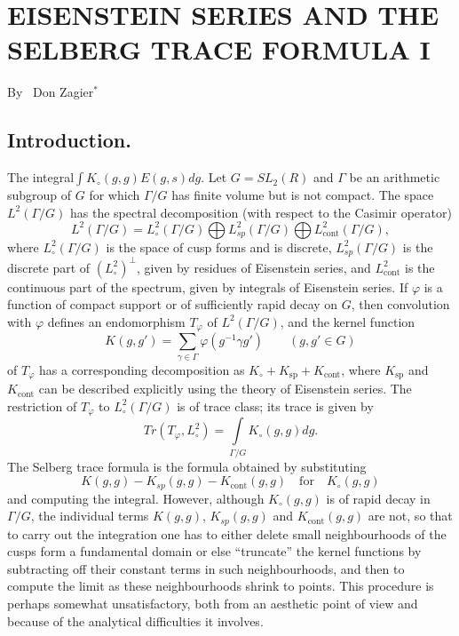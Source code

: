 \chapter{EISENSTEIN SERIES AND THE SELBERG TRACE FORMULA I}

\begin{center}
{\large By~ Don Zagier$^\ast$}
\end{center}

\bigskip

\setcounter{pageoriginal}{302}

\setcounter{section}{-1}
\section{Introduction.}\label{art11-sec0}
The integral\pageoriginale $\int K_\circ (g,g) E (g,s) dg$. Let $G = S L_2 (R)$ and $\Gamma$ be an arithmetic subgroup of $G$ for which $\Gamma / G$ has finite volume but is not compact. The space $L^2 (\Gamma / G)$ has the spectral decomposition (with respect to the Casimir operator)
$$
L^2 (\Gamma / G) = L^2_\circ (\Gamma / G) \bigoplus L^2_{sp} (\Gamma / G) \bigoplus L^2_{\text{cont}} (\Gamma / G),
$$
where $L^2_\circ (\Gamma / G)$ is the space of cusp forms and is discrete, $L^2_{sp} (\Gamma / G)$ is the discrete part of $(L^2_\circ)^\perp$, given by residues of Eisenstein series, and $L^2_{\text{cont}}$ is the continuous part of the spectrum, given by integrals of Eisenstein series. If $\varphi$ is a function of compact support or of sufficiently rapid decay on $G$, then convolution with $\varphi$ defines an endomorphism $T_\varphi$ of $L^2 (\Gamma / G)$, and the kernel function 
\begin{equation*}
K(g, g') = \sum\limits_{\gamma \in \Gamma} \varphi (g^{-1} \gamma g') \qquad (g, g' \in G) \tag{0.1} \label{art11-eq0.1}
\end{equation*}
of $T_\varphi$ has a corresponding decomposition as $K_\circ + K_{\text{sp}} + K_{\text{cont}}$, where $K_{\text{sp}}$ and $K_{\text{cont}}$ can be described explicitly using the theory of Eisenstein series. The restriction of $T_\varphi$ to $L^2_\circ (\Gamma / G)$ is of trace class; its trace is given by 
\begin{equation*}
Tr (T_\varphi, L^2_\circ )  = \int\limits_{\Gamma / G} K_\circ (g, g) dg. \tag{0.2} \label{art11-eq0.2}
\end{equation*}
The Selberg trace formula is the formula obtained by substituting 
$$
K(g,g) - K_{sp} (g,g) - K_{\text{cont}} (g, g)\quad\text{for}\quad K_\circ (g,g)
$$ 
and computing the integral. However, although $K_\circ (g,g)$ is of rapid decay in $\Gamma / G$, the individual terms $K(g,g)$, $K_{sp} (g,g)$ and $K_{\text{cont}} (g,g)$ are not, so that to carry out the integration one has to either delete small neighbourhoods of the cusps form a fundamental domain or else ``truncate'' the kernel functions by subtracting off their constant terms in such neighbourhoods, and then to compute the limit as these neighbourhoods shrink to points. This procedure is perhaps somewhat unsatisfactory, both from an aesthetic point of view and because of the analytical difficulties it involves.

